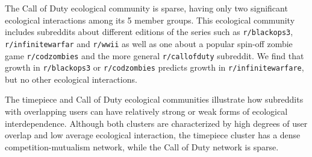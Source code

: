 \documentclass[letterpaper]{article}\usepackage[]{graphicx}\usepackage[]{color}
\def\Slash{\slash\hspace{0pt}}
\begin{document}
The Call of Duty ecological community is sparse, having only two significant ecological interactions among its 5 member groups. This ecological community includes subreddits about different editions of the series such as \texttt{r\Slash blackops3}, \texttt{r\Slash infinitewarfar} and \texttt{r\Slash wwii} as well as one about a popular spin-off zombie game \texttt{r\Slash codzombies} and the more general \texttt{r\Slash callofduty} subreddit. We find that  growth in \texttt{r\Slash blackops3} or \texttt{r\Slash codzombies} predicts growth in \texttt{r\Slash infinitewarfare}, but no other ecological interactions. 

The timepiece and Call of Duty ecological communities illustrate how subreddits with overlapping users can have relatively strong or weak forms of ecological interdependence.  Although both clusters are characterized by high degrees of user overlap and low average ecological interaction, the timepiece cluster has a dense competition-mutualism network, while the Call of Duty network is sparse.









\end{document}
